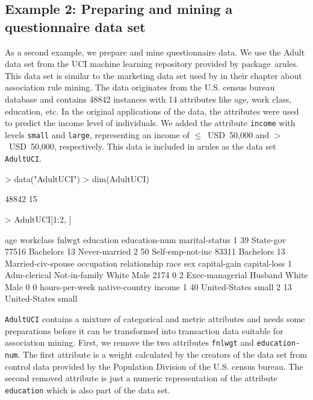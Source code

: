 \documentclass[10pt,a4paper]{article}
\newcommand{\strong}[1]{{\normalfont\fontseries{b}\selectfont #1}}
\newcommand{\code}[1]{\mbox{\texttt{#1}}}
\newcommand{\pkg}[1]{\strong{#1}}
\begin{document}
\subsection{Example 2: Preparing and mining a 
questionnaire data set\label{sec:example-adult}}

As a second example, we prepare and mine questionnaire data.  We use the
Adult data set from the UCI machine learning repository
\citep{arules:Blake+Merz:1998} provided by package~\pkg{arules}.  This
data set is similar to the marketing data set used by
\cite{arules:Hastie+Tibshirani+Friedman:2001} in their chapter about
association rule mining.  The data originates from the U.S. census
bureau database and contains 48842 instances with 14 attributes like
age, work class, education, etc.  In the original applications of the
data, the attributes were used to predict the income level of
individuals.  We added the attribute \code{income} with levels
\code{small} and \code{large}, representing an income of
$\le$~USD~50,000 and $>$~USD~50,000, respectively.  This data is
included in \pkg{arules} as the data set \code{AdultUCI}.


\begin{Schunk}
\begin{Sinput}
> data("AdultUCI")
> dim(AdultUCI)
\end{Sinput}
\begin{Soutput}
[1] 48842    15
\end{Soutput}
\begin{Sinput}
> AdultUCI[1:2, ]
\end{Sinput}
\begin{Soutput}
  age        workclass fnlwgt education education-num     marital-status
1  39        State-gov  77516 Bachelors            13      Never-married
2  50 Self-emp-not-inc  83311 Bachelors            13 Married-civ-spouse
       occupation  relationship  race  sex capital-gain capital-loss
1    Adm-clerical Not-in-family White Male         2174            0
2 Exec-managerial       Husband White Male            0            0
  hours-per-week native-country income
1             40  United-States  small
2             13  United-States  small
\end{Soutput}
\end{Schunk}


\code{AdultUCI} contains a mixture of categorical and metric attributes and
needs some preparations before it can be transformed into
transaction data suitable for association mining.
First, we remove the two attributes \code{fnlwgt} and
\code{education-num}. The first attribute is a weight calculated
by the creators of the data set from control data provided by
the Population Division of the U.S. census bureau. 
The second removed attribute is just a numeric representation of the
attribute \code{education} which is also part of the data set.
\end{document}
